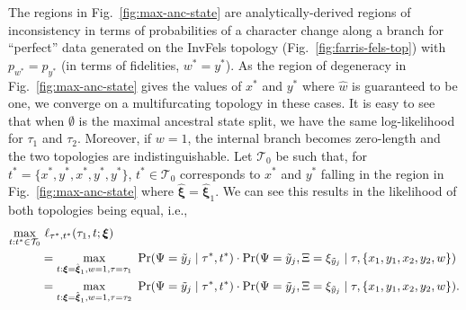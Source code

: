 The regions in Fig.~\ref{fig:max-anc-state} are analytically-derived regions of inconsistency in terms of probabilities of a character change along a branch for ``perfect'' data generated on the InvFels topology (Fig.~\ref{fig:farris-fels-top}) with $p_{w^*} = p_{y^*}$ (in terms of fidelities, $w^*=y^*$).
As the region of degeneracy in Fig.~\ref{fig:max-anc-state} gives the values of $x^*$ and $y^*$ where $\hat{w}$ is guaranteed to be one, we converge on a multifurcating topology in these cases.
It is easy to see that when $\emptyset$ is the maximal ancestral state split, we have the same log-likelihood for $\tau_1$ and $\tau_2$.
Moreover, if $w=1$, the internal branch becomes zero-length and the two topologies are indistinguishable.
Let $\mathcal{T}_0$ be such that, for $t^*=\{x^*,y^*,x^*,y^*,y^*\}$, $t^*\in\mathcal{T}_0$ corresponds to $x^*$ and $y^*$ falling in the region in Fig.~\ref{fig:max-anc-state} where $\hat{\boldsymbol\xi}=\hat{\boldsymbol\xi}_1$.
We can see this results in the likelihood of both topologies being equal, i.e.,
\begin{align*}
\max_{t : t^*\in\mathcal{T}_0} & \ \ell_{\tau^*,t^*}(\tau_1, t; \boldsymbol\xi)\\
&= \max_{t: \boldsymbol\xi=\hat{\boldsymbol\xi}_1, w=1, \tau=\tau_1} \ \Pr(\Psi=\tilde{y}_j \mid \tau^*, t^*) \cdot \Pr(\Psi=\tilde{y}_j, \Xi=\xi_{\tilde{y}_j} \mid \tau, \{x_1,y_1,x_2,y_2,w\})\\
&= \max_{t: \boldsymbol\xi=\hat{\boldsymbol\xi}_1, w=1, \tau=\tau_2} \ \Pr(\Psi=\tilde{y}_j \mid \tau^*, t^*) \cdot \Pr(\Psi=\tilde{y}_j, \Xi=\xi_{\tilde{y}_j} \mid \tau, \{x_1,y_1,x_2,y_2,w\}).
\end{align*}

